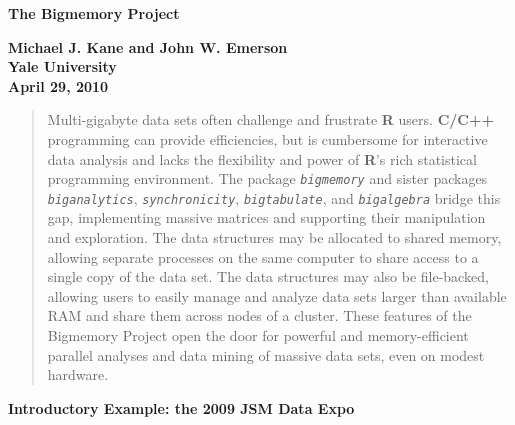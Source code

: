 \documentclass[12pt]{article}
\newcommand{\proglang}[1]{\textbf{#1}}
\newcommand{\pkg}[1]{\texttt{\textsl{#1}}}
\begin{document}



\begin{center}


{\Large\bf The Bigmemory Project}


\vspace*{0.5cm}
{\bf Michael J. Kane and John W. Emerson\\
Yale University\\
April 29, 2010}

\vspace*{0.25cm}

\end{center}

\parindent=0.5in


\begin{quotation}
Multi-gigabyte data sets often challenge and frustrate \proglang{R}
users.  \proglang{C/C++} programming can provide efficiencies,
but is cumbersome for interactive data analysis and
lacks the flexibility and power of \proglang{R}'s rich statistical
programming environment.  The package \pkg{bigmemory} and sister
packages \pkg{biganalytics}, \pkg{synchronicity}, \pkg{bigtabulate},
and \pkg{bigalgebra} bridge this gap, implementing massive matrices
and supporting their manipulation and exploration.
The data structures may be allocated to shared memory, allowing separate 
processes on the same computer to share access to a single copy of the
data set.  The data structures may also be file-backed, allowing users
to easily manage and analyze data sets larger than available RAM and
share them across nodes of a cluster.
These features of the Bigmemory Project open the door for powerful and
memory-efficient parallel analyses and data mining of massive data sets,
even on modest hardware.
\end{quotation} 


\vspace*{0.5cm}
\noindent
{\bf Introductory Example: the 2009 JSM Data Expo}
\vspace*{0.5cm}
\end{document}
